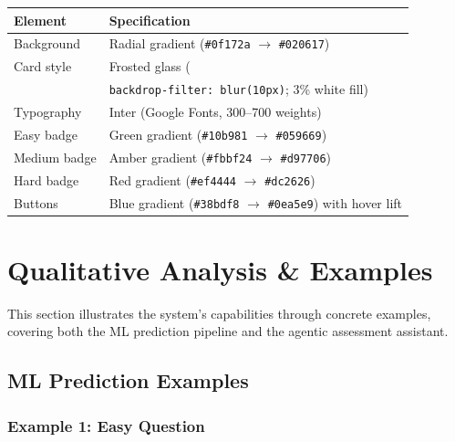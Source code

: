 \documentclass[12pt, a4paper, twoside]{article}
\newcommand{\code}[1]{\texttt{#1}}
\begin{document}
\begin{center}
\renewcommand{\arraystretch}{1.2}
\begin{tabular}{ll}
    \toprule
    \textbf{Element} & \textbf{Specification} \\
    \midrule
    Background       & Radial gradient (\code{\#0f172a} $\to$
                       \code{\#020617}) \\
    Card style       & Frosted glass (\\
                     & \code{backdrop-filter: blur(10px)};
                       3\% white fill) \\
    Typography       & Inter (Google Fonts, 300--700 weights) \\
    Easy badge       & Green gradient (\code{\#10b981} $\to$
                       \code{\#059669}) \\
    Medium badge     & Amber gradient (\code{\#fbbf24} $\to$
                       \code{\#d97706}) \\
    Hard badge       & Red gradient (\code{\#ef4444} $\to$
                       \code{\#dc2626}) \\
    Buttons          & Blue gradient (\code{\#38bdf8} $\to$
                       \code{\#0ea5e9}) with hover lift \\
    \bottomrule
\end{tabular}
\end{center}

\section{Qualitative Analysis \& Examples}\label{sec:qualitative}

This section illustrates the system's capabilities through concrete
examples, covering both the ML prediction pipeline and the agentic
assessment assistant.

\subsection{ML Prediction Examples}

\subsubsection{Example 1: Easy Question}
\end{document}
